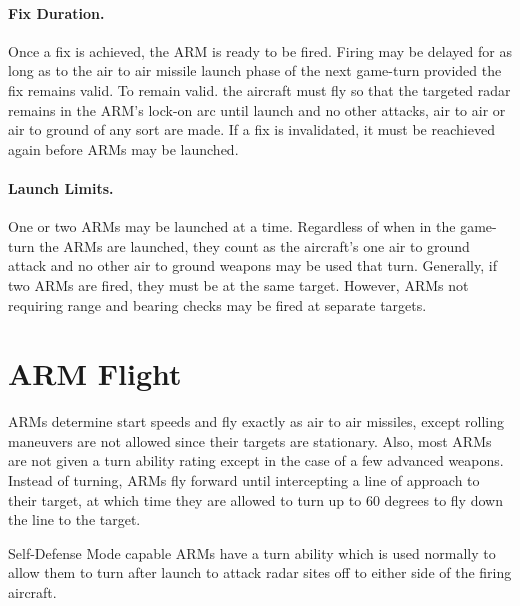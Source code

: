 
\paragraph{Fix Duration.} Once a fix is achieved, the ARM is ready to be fired. Firing may be delayed for as long as to the air to air missile launch phase of the next game-turn provided the fix remains valid. To remain valid. the aircraft must fly so that the targeted radar remains in the ARM's lock-on arc until launch and no other attacks, air to air or air to ground of any sort are made. If a fix is invalidated, it must be reachieved again before ARMs may be launched.

\paragraph{Launch Limits.} One or two ARMs may be launched at a time.  Regardless of when in the game-turn the ARMs are launched, they count as the aircraft's one air to ground attack and no other air to ground weapons may be used that turn. Generally, if two ARMs are fired, they must be at the same target. However, ARMs not requiring range and bearing checks may be fired at separate targets.

\section{ARM Flight}

ARMs determine start speeds and fly exactly as air to air missiles, except rolling maneuvers are not allowed since their targets are stationary. Also, most ARMs are not given a turn ability rating except in the case of a few advanced weapons. Instead of turning, ARMs fly forward until intercepting a line of approach to their target, at which time they are allowed to turn up to 60 degrees to fly down the line to the target. 

Self-Defense Mode capable ARMs have a turn ability which is used normally to allow them to turn after launch to attack radar sites off to either side of the firing aircraft.

